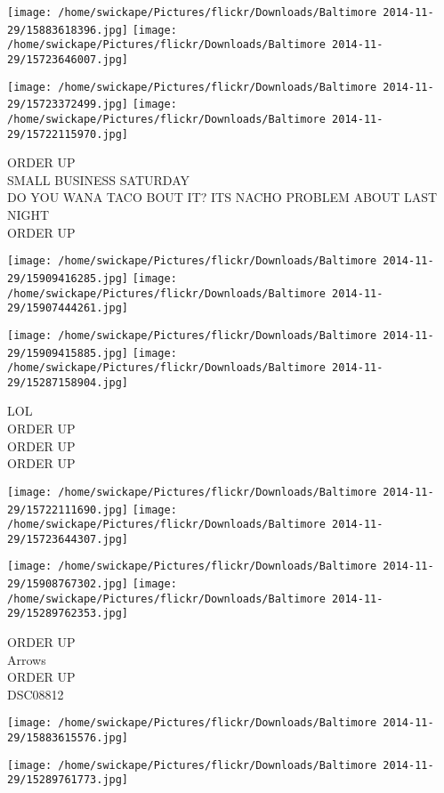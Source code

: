 \documentclass[10pt,letterpaper]{article}
\begin{document}
\texttt{[image: /home/swickape/Pictures/flickr/Downloads/Baltimore 2014-11-29/15883618396.jpg]}
\texttt{[image: /home/swickape/Pictures/flickr/Downloads/Baltimore 2014-11-29/15723646007.jpg]}

\texttt{[image: /home/swickape/Pictures/flickr/Downloads/Baltimore 2014-11-29/15723372499.jpg]}
\texttt{[image: /home/swickape/Pictures/flickr/Downloads/Baltimore 2014-11-29/15722115970.jpg]}

ORDER UP\\
SMALL BUSINESS SATURDAY\\
DO YOU WANA TACO BOUT IT?  ITS NACHO PROBLEM ABOUT LAST NIGHT\\
ORDER UP
\pagebreak

\texttt{[image: /home/swickape/Pictures/flickr/Downloads/Baltimore 2014-11-29/15909416285.jpg]}
\texttt{[image: /home/swickape/Pictures/flickr/Downloads/Baltimore 2014-11-29/15907444261.jpg]}

\texttt{[image: /home/swickape/Pictures/flickr/Downloads/Baltimore 2014-11-29/15909415885.jpg]}
\texttt{[image: /home/swickape/Pictures/flickr/Downloads/Baltimore 2014-11-29/15287158904.jpg]}

LOL\\
ORDER UP\\
ORDER UP\\
ORDER UP
\pagebreak

\texttt{[image: /home/swickape/Pictures/flickr/Downloads/Baltimore 2014-11-29/15722111690.jpg]}
\texttt{[image: /home/swickape/Pictures/flickr/Downloads/Baltimore 2014-11-29/15723644307.jpg]}

\texttt{[image: /home/swickape/Pictures/flickr/Downloads/Baltimore 2014-11-29/15908767302.jpg]}
\texttt{[image: /home/swickape/Pictures/flickr/Downloads/Baltimore 2014-11-29/15289762353.jpg]}

ORDER UP\\
Arrows\\
ORDER UP\\
DSC08812
\pagebreak

\texttt{[image: /home/swickape/Pictures/flickr/Downloads/Baltimore 2014-11-29/15883615576.jpg]}

\vspace{0.25in}
\texttt{[image: /home/swickape/Pictures/flickr/Downloads/Baltimore 2014-11-29/15289761773.jpg]}
\end{document}
